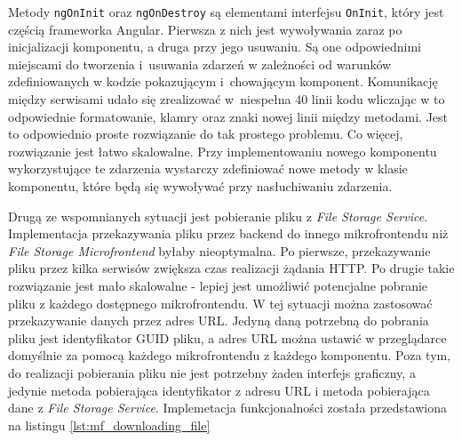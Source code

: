 \documentclass{SGGW-thesis}
\begin{document}
  

  \vfill

  

  Metody \lstinline{ngOnInit} oraz \lstinline{ngOnDestroy} są elementami interfejsu \lstinline{OnInit}, który jest częścią frameworka Angular. Pierwsza z nich jest wywoływania zaraz po inicjalizacji komponentu, a druga przy jego usuwaniu. Są one odpowiednimi miejscami do tworzenia i~usuwania zdarzeń w zależności od warunków zdefiniowanych w kodzie pokazującym i~chowającym komponent. Komunikację między serwisami udało się zrealizować w~niespełna 40 linii kodu wliczając w to odpowiednie formatowanie, klamry oraz znaki nowej linii między metodami. Jest to odpowiednio proste rozwiązanie do tak prostego problemu. Co więcej, rozwiązanie jest łatwo skalowalne. Przy implementowaniu nowego komponentu wykorzystujące te zdarzenia wystarczy zdefiniować nowe metody w klasie komponentu, które będą się wywoływać przy nasłuchiwaniu zdarzenia.

  Drugą ze wspomnianych sytuacji jest pobieranie pliku z \textit{File Storage Service}. Implementacja przekazywania pliku przez backend do innego mikrofrontendu niż \textit{File Storage Microfrontend} byłaby nieoptymalna. Po pierwsze, przekazywanie pliku przez kilka serwisów zwiększa czas realizacji żądania HTTP. Po drugie takie rozwiązanie jest mało skalowalne - lepiej jest umożliwić potencjalne pobranie pliku z każdego dostępnego mikrofrontendu. W tej sytuacji można zastosować przekazywanie danych przez adres URL. Jedyną daną potrzebną do pobrania pliku jest identyfikator GUID pliku, a adres URL można ustawić w przeglądarce domyślnie za pomocą każdego mikrofrontendu z każdego komponentu. Poza tym, do realizacji pobierania pliku nie jest potrzebny żaden interfejs graficzny, a jedynie metoda pobierająca identyfikator z adresu URL i metoda pobierająca dane z \textit{File Storage Service}. Implemetacja funkcjonalności została przedstawiona na listingu \cref{lst:mf_downloading_file}

  
\end{document}
